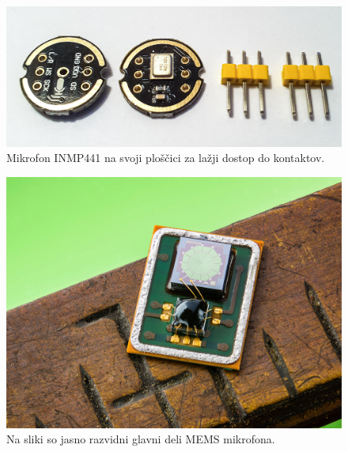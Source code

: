 \documentclass[a4paper, 12pt]{book}
\begin{document}
\begin{figure}[H]
    \centering
    \includegraphics[width=\linewidth]{slikovno_gradivo/INMP441_1.jpg}
    \caption{Mikrofon INMP441 na svoji ploščici za lažji dostop do kontaktov.}
    \label{fig:INMP441}
\end{figure}


\begin{figure}[H]
    \centering
    \includegraphics[width=\linewidth]{slikovno_gradivo/mems-mic2.jpg}
    \caption{Na sliki so jasno razvidni glavni deli MEMS mikrofona.}
    \label{fig:mems_mic}
\end{figure}
\end{document}
